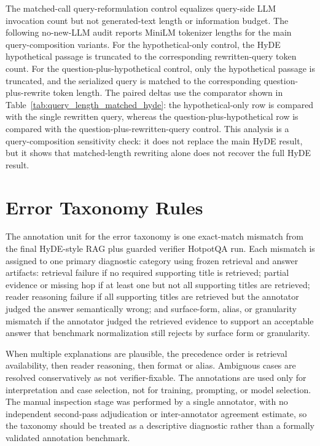 \documentclass[pdflatex,sn-basic,Numbered]{sn-jnl}
\begin{document}
The matched-call query-reformulation control equalizes query-side LLM invocation count but not generated-text length or information budget. The following no-new-LLM audit reports MiniLM tokenizer lengths for the main query-composition variants. For the hypothetical-only control, the HyDE hypothetical passage is truncated to the corresponding rewritten-query token count. For the question-plus-hypothetical control, only the hypothetical passage is truncated, and the serialized query is matched to the corresponding question-plus-rewrite token length. The paired deltas use the comparator shown in Table~\ref{tab:query_length_matched_hyde}: the hypothetical-only row is compared with the single rewritten query, whereas the question-plus-hypothetical row is compared with the question-plus-rewritten-query control. This analysis is a query-composition sensitivity check: it does not replace the main HyDE result, but it shows that matched-length rewriting alone does not recover the full HyDE result.



\FloatBarrier
\section{Error Taxonomy Rules}
\label{sec:supp_error_taxonomy_rules}

The annotation unit for the error taxonomy is one exact-match mismatch from the final HyDE-style RAG plus guarded verifier HotpotQA run. Each mismatch is assigned to one primary diagnostic category using frozen retrieval and answer artifacts: retrieval failure if no required supporting title is retrieved; partial evidence or missing hop if at least one but not all supporting titles are retrieved; reader reasoning failure if all supporting titles are retrieved but the annotator judged the answer semantically wrong; and surface-form, alias, or granularity mismatch if the annotator judged the retrieved evidence to support an acceptable answer that benchmark normalization still rejects by surface form or granularity.

When multiple explanations are plausible, the precedence order is retrieval availability, then reader reasoning, then format or alias. Ambiguous cases are resolved conservatively as not verifier-fixable. The annotations are used only for interpretation and case selection, not for training, prompting, or model selection. The manual inspection stage was performed by a single annotator, with no independent second-pass adjudication or inter-annotator agreement estimate, so the taxonomy should be treated as a descriptive diagnostic rather than a formally validated annotation benchmark.
\end{document}
